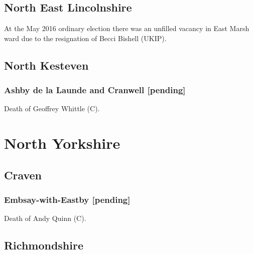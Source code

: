 \documentclass[a4paper,openany]{book}
\begin{document}
\begin{resultsiii}
\subsection*{North East Lincolnshire}

At the May 2016 ordinary election there was an unfilled vacancy in East Marsh ward due to the resignation of Becci Bishell (UKIP).

\subsection*{North Kesteven}

\subsubsection*{Ashby de la Launde and Cranwell \hspace*{\fill}\nolinebreak[1]%
\enspace\hspace*{\fill}
[pending]}


Death of Geoffrey Whittle (C).

\section{North Yorkshire}

\subsection*{Craven}

\subsubsection*{Embsay-with-Eastby \hspace*{\fill}\nolinebreak[1]%
\enspace\hspace*{\fill}
[pending]}


Death of Andy Quinn (C).

\subsection*{Richmondshire}


\end{resultsiii}
\end{document}
